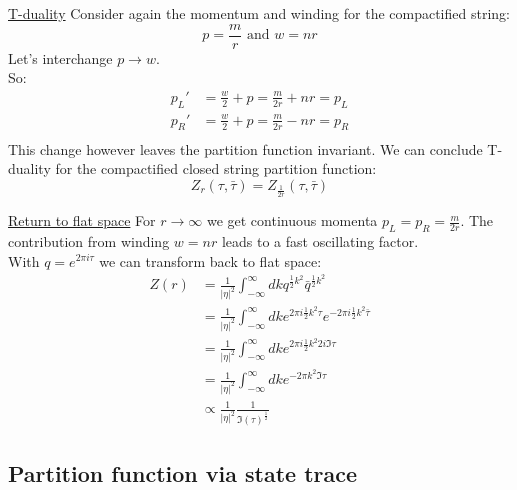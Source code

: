 \documentclass[11pt,aspectratio=169]{beamer}
\begin{document}
\begin{frame}{\underline{T-duality}}
	Consider again the momentum and winding for the compactified string:
	\begin{equation}
		p = \frac{m}{r} \textrm{ and } w = nr
	\end{equation}
	Let's interchange $p \rightarrow w$. 
	\\
	So:
	\begin{align*}
		p_L' &= \frac{w}{2} + p = \frac{m}{2r} + nr = p_L\\
		p_R' &= \frac{w}{2} + p = \frac{m}{2r} - nr = p_R \\
	\end{align*}
	This change however leaves the partition function invariant. We can conclude T-duality for the compactified closed string partition function:
	\begin{equation}
		Z_r (\tau, \bar{\tau}) = Z_{\frac{1}{2r}} (\tau, \bar{\tau})
	\end{equation}
\end{frame}

\begin{frame}{\underline{Return to flat space}}
	For $r \rightarrow \infty$ we get continuous momenta $p_L = p_R = \frac{m}{2r}$. The contribution from winding $w = nr$ leads to a fast oscillating factor.
	\\
	With $q = e^{2\pi i \tau}$ we can transform back to flat space:
	\begin{align*}
		Z(r) &= \frac{1}{|\eta|^2} \int_{-\infty}^{\infty}dk q^{\frac{1}{2}k^2}\bar{q}^{\frac{1}{2}k^2} \\
		&= \frac{1}{|\eta|^2} \int_{-\infty}^{\infty}dk e^{2\pi i \frac{1}{2}k^2 \tau}e^{-2\pi i \frac{1}{2}k^2 \bar{\tau}} \\
		&= \frac{1}{|\eta|^2} \int_{-\infty}^{\infty}dk e^{2\pi i \frac{1}{2}k^2 2 i \Im{\tau}} \\
		&= \frac{1}{|\eta|^2} \int_{-\infty}^{\infty}dk e^{-2\pi k^2 \Im{\tau}} \\
		&\propto \frac{1}{|\eta|^2} \frac{1}{\Im(\tau)^{\frac{1}{2}}}
	\end{align*}
	
\end{frame}









\subsection{Partition function via state trace}
\end{document}

